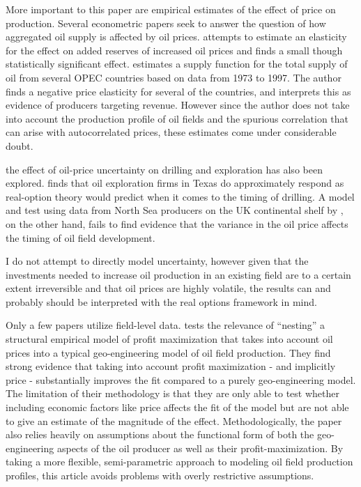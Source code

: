 \documentclass[11pt]{article}
\begin{document}
More important to this paper are empirical estimates of the effect of price on production. Several econometric papers seek to answer the question of how aggregated oil supply is affected by oil prices.  \citet{farzin_impact_2001} attempts to estimate an elasticity for the effect on added reserves of increased oil prices and finds a small though statistically significant effect.  \citet{ramcharran_oil_2002} estimates a supply function for the total supply of oil from several OPEC countries based on data from 1973 to 1997.  The author finds a negative price elasticity for several of the countries, and interprets this as evidence of producers targeting revenue.  However since the author does not take into account the production profile of oil fields and the spurious correlation that can arise with autocorrelated prices, these estimates come under considerable doubt.  

the effect of oil-price uncertainty on drilling and exploration has also been explored.  \citet{kellogg_effect_2014} finds that oil exploration firms in Texas do approximately respond as real-option theory would predict when it comes to the timing of drilling.  A model and test using data from North Sea producers on the UK continental shelf by \citet{hurn_geology_1994}, on the other hand, fails to find evidence that the variance in the oil price affects the timing of oil field development.  

I do not attempt to directly model uncertainty, however given that the investments needed to increase oil production in an existing field are to a certain extent irreversible and that oil prices are highly volatile, the results can and probably should be interpreted with the real options framework in mind.  

Only a few papers utilize field-level data.  \citet{black_is_1998} tests the relevance of “nesting” a structural empirical model of profit maximization that takes into account oil prices into a typical geo-engineering model of oil field production.  They find strong evidence that taking into account profit maximization - and implicitly price - substantially improves the fit compared to a purely geo-engineering model.   The limitation of their methodology is that they are only able to test whether including economic factors like price affects the fit of the model but are not able to give an estimate of the magnitude of the effect.  Methodologically, the paper also relies heavily on assumptions about the functional form of both the geo-engineering aspects of the oil producer as well as their profit-maximization.  By taking a more flexible, semi-parametric approach to modeling oil field production profiles, this article avoids problems with overly restrictive assumptions. 
\end{document}
